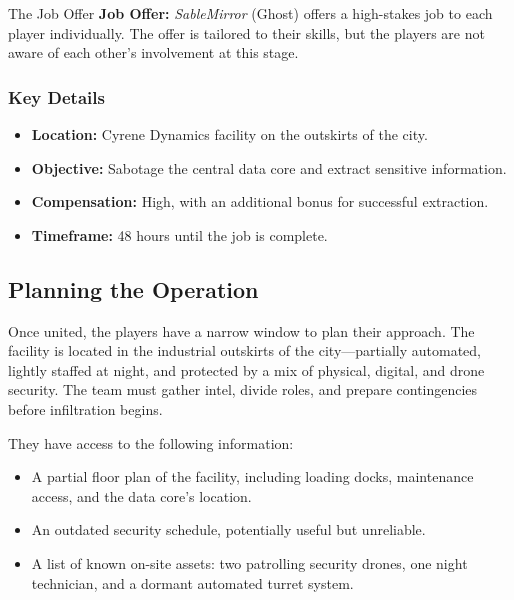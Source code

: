 \begin{CommentBox}{The Job Offer}
    \textbf{Job Offer:} \emph{SableMirror} (Ghost) offers a high-stakes job to each player individually. The offer is tailored to their skills, but the players are not aware of each other’s involvement at this stage.

    \vspace{0.5\baselineskip}

    \subsubsection{Key Details}
    \begin{itemize}
        \item \textbf{Location:} Cyrene Dynamics facility on the outskirts of the city.
        \item \textbf{Objective:} Sabotage the central data core and extract sensitive information.
        \item \textbf{Compensation:} High, with an additional bonus for successful extraction.
        \item \textbf{Timeframe:} 48 hours until the job is complete.
    \end{itemize}
\end{CommentBox}

\subsection*{Planning the Operation}

Once united, the players have a narrow window to plan their approach. The facility is located in the industrial outskirts of the city—partially automated, lightly staffed at night, and protected by a mix of physical, digital, and drone security. The team must gather intel, divide roles, and prepare contingencies before infiltration begins.

They have access to the following information:
\begin{itemize}
    \item A partial floor plan of the facility, including loading docks, maintenance access, and the data core's location.
    \item An outdated security schedule, potentially useful but unreliable.
    \item A list of known on-site assets: two patrolling security drones, one night technician, and a dormant automated turret system.
\end{itemize}



